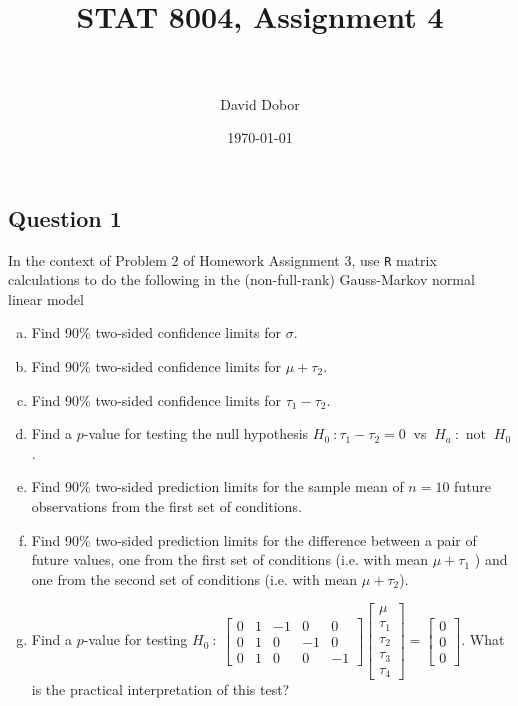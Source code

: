 \documentclass[paper=a4, fontsize=11pt]{scrartcl} %
\title{	
\normalfont \normalsize 
\horrule{0.5pt} \\[0.4cm] %
\huge STAT 8004, Assignment 4 \\ %
\horrule{2pt} \\[0.5cm] %
}
\author{David Dobor}
\date{\normalsize\today} %
\begin{document}
\maketitle 

\subsection*{Question 1}
In the context of Problem 2 of Homework Assignment 3, use \texttt{R} matrix 
calculations to do the following in the (non-full-rank) Gauss-Markov normal linear 
model


\begin{enumerate}[(a)]
\item Find 90\% two-sided confidence limits for $\sigma$.

\item Find 90\% two-sided confidence limits for $\mu + \tau_2$.

\item Find 90\% two-sided confidence limits for $\tau_1 -  \tau_2$.

\item Find a $p$-value for testing the null hypothesis $H_0 \ : \tau_1 -  \tau_2 = 0 \ $ vs $\ H_a \ : \text{ not } \ H_0$.

\item Find 90\% two-sided prediction limits for the sample mean of $ n = 10$ future observations from
the first set of conditions.

\item Find 90\% two-sided prediction limits for the difference between a pair of future values, one
from the first set of conditions (i.e. with mean  $\mu + \tau_1$ ) and one from the second set of conditions
(i.e. with mean  $\mu + \tau_2$).

\item Find a $p$-value for testing $H_0 \ : \ 
\begin{bmatrix} 0 & 1 & -1 & 0 & 0 \\
                             0 & 1 & 0 & -1 & 0 \\
                             0 & 1 & 0 & 0 & -1
\end{bmatrix}
\begin{bmatrix} \mu\\
                             \tau_1\\
                             \tau_2\\
                             \tau_3\\
                             \tau_4
\end{bmatrix}
=
\begin{bmatrix} 0\\
                             0\\
                             0
\end{bmatrix}
$. What is the practical interpretation of this test?


\end{enumerate}
\end{document}
